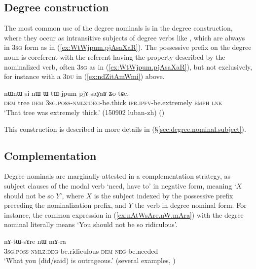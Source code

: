 \subsection{Degree construction} \label{sec:degree.nominal.construction}
The most common use of the degree nominals is in the degree construction, where they occur as intransitive subjects of degree verbs like , which are always in \textsc{3sg} form as in (\ref{ex:WtWjpum.pjAsaXaR}). The possessive prefix on the degree noun is coreferent with the referent having the property described by the nominalized verb, often \textsc{3sg} as in  (\ref{ex:WtWjpum.pjAsaXaR}), but not exclusively, for instance with a \textsc{3du} in (\ref{ex:ndZitAmWmi}) above.


\begin{exe}
\ex \label{ex:WtWjpum.pjAsaXaR}
\gll nɯnɯ si nɯ ɯ-tɯ-jpum pjɤ-saχaʁ ʑo tɕe,\\
\textsc{dem} tree \textsc{dem} \textsc{3sg}.\textsc{poss}-\textsc{nmlz}:\textsc{deg}-be.thick \textsc{ifr}.\textsc{ipfv}-be.extremely \textsc{emph} \textsc{lnk} \\
\glt `That tree was extremely thick.' (150902 luban-zh)
()
\end{exe}

This construction is described in more details in (§\ref{sec:degree.nominal.subject}).



\subsection{Complementation} \label{sec:degree.nominal.complement}
Degree nominals are marginally attested in a complementation strategy, as subject clauses of the modal verb  `need, have to' in negative form, meaning `$X$ should not be so $Y$', where $X$ is the subject indexed by the possessive prefix preceding the  nominalization prefix, and $Y$ the verb in degree nominal form. For instance, the common expression in (\ref{ex:nAtWsAre.nW.mAra}) with the degree nominal  literally means `You should not be so ridiculous'.  

\begin{exe}
\ex \label{ex:nAtWsAre.nW.mAra}
\gll  nɤ-tɯ-sɤre nɯ mɤ-ra \\
\textsc{3sg}.\textsc{poss}-\textsc{nmlz}:\textsc{deg}-be.ridiculous \textsc{dem} \textsc{neg}-be.needed \\
\glt `What you (did/said) is outrageous.' (several examples, )
\end{exe}

